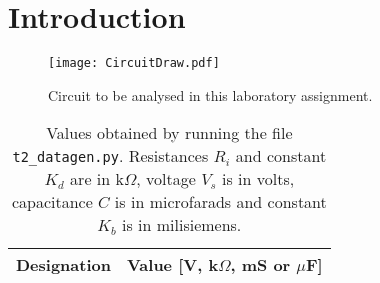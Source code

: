 \section{Introduction}
\label{sec:introduction}

\begin{figure}[H] \centering
  \texttt{[image: CircuitDraw.pdf]}
  \caption{Circuit to be analysed in this laboratory assignment.}
  \label{fig:CircuitDraw}
\end{figure}


\begin{table}[H]
  \centering
  \begin{tabular}{|c|c|}
    \hline    
    {\bf Designation} & {\bf Value [V, k$\Omega$, mS or $\mu$F]} \\ \hline
    
  \end{tabular}
  \caption{Values obtained by running the file \texttt{t2\_datagen.py}. Resistances $R_i$ and constant $K_d$ are in k$\Omega$, voltage $V_s$ is in volts, capacitance $C$ is in microfarads and constant $K_b$ is in milisiemens.}
  \label{tab:GivenValues}
\end{table}

